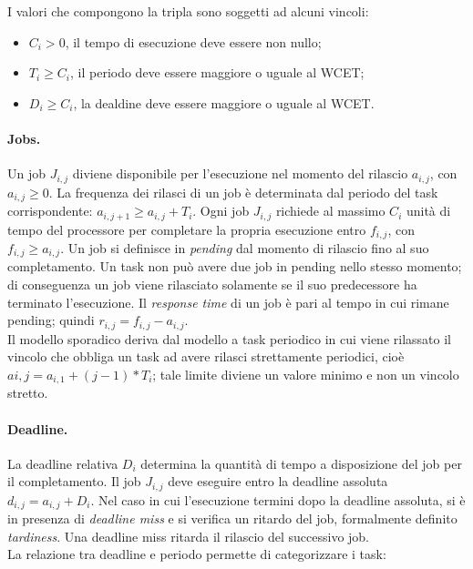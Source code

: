 I valori che compongono la tripla sono soggetti ad alcuni vincoli:\\

\begin{itemize}
	\item $C_i > 0$, il tempo di esecuzione deve essere non nullo;
	\item $T_i \geq C_i$, il periodo deve essere maggiore o uguale al WCET;
	\item $D_i \geq C_i$, la dealdine deve essere maggiore o uguale al WCET.\\
\end{itemize}

\paragraph{Jobs.} Un job $J_{i,j}$ diviene disponibile per l'esecuzione nel momento del rilascio $a_{i,j}$, con $a_{i,j} \geq 0$. La frequenza dei rilasci di un job è determinata dal periodo del task corrispondente: $a_{i,j+1} ≥ a_{i,j} + T_i$. Ogni job $J_{i,j}$ richiede al massimo $C_i$ unità di tempo del processore per completare la propria esecuzione entro $f_{i,j}$, con $f_{i,j} \geq a_{i,j}$. Un job si definisce in \textit{pending} dal momento di rilascio fino al suo completamento. Un task non può avere due job in pending nello stesso momento; di conseguenza un job viene rilasciato solamente se il suo predecessore ha terminato l'esecuzione. Il \textit{response time} di un job è pari al tempo in cui rimane pending; quindi $r_{i,j} = f_{i,j} − a_{i,j}$.\\
Il modello sporadico deriva dal modello a task periodico in cui viene rilassato il vincolo che obbliga un task ad avere rilasci strettamente periodici, cioè $ai,j = a_{i,1} + (j − 1) * T_i$; tale limite diviene un valore minimo e non un vincolo stretto.

\paragraph{Deadline.} La deadline relativa $D_i$ determina la quantità di tempo a disposizione del job per il completamento. Il job $J_{i,j}$ deve eseguire entro la deadline assoluta $d_{i,j} = a_{i,j} + D_i$. Nel caso in cui l'esecuzione termini dopo la deadline assoluta, si è in presenza di \textit{deadline miss} e si verifica un ritardo del job, formalmente definito \textit{tardiness}. Una deadline miss ritarda il rilascio del successivo job.\\
La relazione tra deadline e periodo permette di categorizzare i task:

